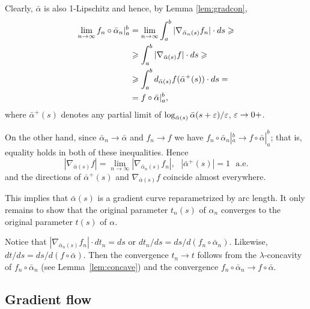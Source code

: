 \documentclass{article}
\begin{document}
Clearly, $\bar\alpha$ is also 1-Lipschitz and hence, by Lemma \ref{lem:gradcon},
\begin{align*}
\lim_{n\to\infty}f_n\circ\bar\alpha_n|_a^b
&=
\lim_{n\to\infty}
\int_a^b|\nabla_{\bar\alpha_n(s)} f_n|\cdot d s\geqslant
\\
&\geqslant\int_a^b|\nabla_{\bar\alpha(s)} f|\cdot d s
\geqslant 
\\
&\geqslant
\int_a^b d_{\bar\alpha(s)} f(\bar\alpha^+(s))\cdot d s
=
\\
&=
f\circ\bar\alpha|_a^b, 
\end{align*}
where $\bar\alpha^+(s)$ denotes any partial limit of
$\log_{\bar\alpha(s)}\bar\alpha(s+\varepsilon)/\varepsilon$, $\varepsilon\to0+$.

On the other hand, 
since $\bar\alpha_n\to\bar\alpha$ 
and $f_n\to f$ 
we have $f_n\circ\bar\alpha_n|_a^b \to f\circ\bar\alpha|_a^b$;
that is, equality holds in both of these inequalities. 
Hence 
$$|\nabla_{\bar\alpha(s)} f|= \lim_{n\to\infty} |\nabla_{\bar\alpha_n(s)} f_n|,\
\ \ 
|\bar\alpha^+(s)|= 1\ \ \ \text{a.e.}$$
and the directions of $\bar\alpha^+(s)$ and  $\nabla_{\bar\alpha(s)} f$ 
coincide almost everywhere.

This implies that $\bar\alpha(s)$ is a gradient curve reparametrized by 
arc length. 
It only remains to show that the original 
parameter $t_n(s)$ of $\alpha_n$ converges to the original 
parameter $t(s)$ of $\alpha$.

Notice that $|\nabla_{\bar\alpha_n(s)} f_n|\cdot d t_n=d s$ or 
$d t_n/d s=d s/d(f_n\circ\bar\alpha_n)$. 
Likewise, $d t/d s=d s/d(f\circ\bar\alpha)$. 
Then the convergence $t_n\to t$ follows from the $\lambda$-concavity of 
$f_n\circ\bar\alpha_n$ (see Lemma~\ref{lem:concave}) 
and the convergence $f_n\circ\bar\alpha_n\to f\circ\bar\alpha.$\qeds








\subsection{Gradient flow}\label{grad-flow}
\end{document}
